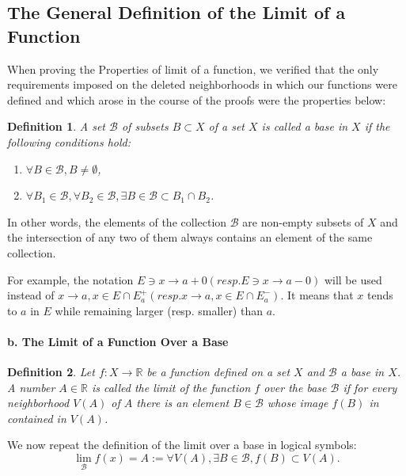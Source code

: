 \documentclass[a4paper,12pt]{article} %
\newtheorem{definition}{Definition}[section]
\begin{document}
\subsection{The General Definition of the Limit of a Function}
When proving the Properties of limit of a function, we verified that 
the only requirements imposed on the deleted neighborhoods in which 
our functions were defined and which arose in the course of the proofs 
were the properties below:
\begin{definition}
    A set $\mathcal{B}$ of subsets $B \subset X$ of a set $X$ is called a base 
    in $X$ if the following conditions hold:
    \begin{enumerate}
        \item $\displaystyle \forall B \in \mathcal{B}, B \ne \emptyset$,
        \item $\displaystyle \forall B_1\in \mathcal{B}, \forall B_2 
            \in \mathcal{B}, \exists B \in \mathcal{B} \subset B_1 \cap B_2$.
    \end{enumerate}
\end{definition}
In other words, the elements of the collection $\mathcal{B}$ are 
non-empty subsets of $X$ and the intersection of any two of them always 
contains an element of the same collection.

For example, the notation $\displaystyle E \ni x \to a + 0 (resp. E \ni x \to a - 0)$ 
will be used instead of $\displaystyle x \to a, x \in E \cap E_a^+ 
(resp. x \to a, x \in E \cap E_a^-)$. It means that $x$ tends to $a$ in $E$ while 
remaining larger (resp. smaller) than $a$.

\paragraph{{\rm \textbf{b. The Limit of a Function Over a Base}}}

\begin{definition}
    Let $\displaystyle f: X \to \mathbb{R}$ be a function defined on a set 
    $X$ and $\mathcal{B}$ a base in $X$. A number $A \in \mathbb{R}$ is called 
    the limit of the function $f$ over the base $\mathcal{B}$ if for every 
    neighborhood $V(A)$ of $A$ there is an element $B \in \mathcal{B}$
    whose image $f(B)$ in contained in $V(A)$.
\end{definition}
We now repeat the definition of the limit over a base in logical symbols:
\[
    \lim_{\mathcal{B}}f(x) = A := \forall V(A), \exists B \in \mathcal{B}, f(B) \subset V(A).
\]
\end{document}
